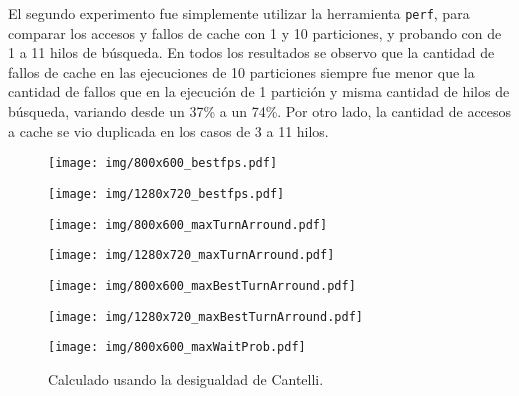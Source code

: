 El segundo experimento fue simplemente utilizar la herramienta \texttt{perf},
para comparar los accesos y fallos de cache con 1 y 10 particiones, y probando
con de 1 a 11 hilos de búsqueda. En todos los resultados se observo que la
cantidad de fallos de cache en las ejecuciones de 10 particiones siempre fue
menor que la cantidad de fallos que en la ejecución de 1 partición y misma
cantidad de hilos de búsqueda, variando desde un 37\% a un 74\%. Por otro lado,
la cantidad de accesos a cache se vio duplicada en los casos de 3 a 11 hilos.

\begin{figure}[h]

	\texttt{[image: img/800x600\_bestfps.pdf]}
	\caption{}

\end{figure}

\begin{figure}[h]

	\texttt{[image: img/1280x720\_bestfps.pdf]}
	\caption{}

\end{figure}

\begin{figure}[h]

	\texttt{[image: img/800x600\_maxTurnArround.pdf]}
	\caption{}

\end{figure}

\begin{figure}[h]

	\texttt{[image: img/1280x720\_maxTurnArround.pdf]}
	\caption{}

\end{figure}

\begin{figure}[h]

	\texttt{[image: img/800x600\_maxBestTurnArround.pdf]}
	\caption{}

\end{figure}

\begin{figure}[h]

	\texttt{[image: img/1280x720\_maxBestTurnArround.pdf]}
	\caption{}

\end{figure}

\begin{figure}[h]

	\texttt{[image: img/800x600\_maxWaitProb.pdf]}
	\caption{Calculado usando la desigualdad de Cantelli.}

\end{figure}

